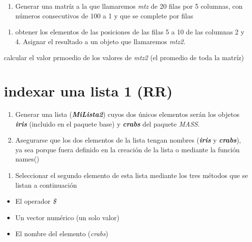 \documentclass[]{book}
\providecommand{\tightlist}{%
  \setlength{\itemsep}{0pt}\setlength{\parskip}{0pt}}
\begin{document}
\begin{enumerate}
\def\labelenumi{\arabic{enumi}.}
\tightlist
\item
  Generar una matríz a la que llamaremos \emph{mtz} de 20 filas por 5 columnas, con números consecutivos de 100 a 1 y que se complete por filas
\end{enumerate}

\begin{enumerate}
\def\labelenumi{\arabic{enumi}.}
\setcounter{enumi}{1}
\tightlist
\item
  obtener los elementos de las posiciones de las filas 5 a 10 de las columnas 2 y 4. Asignar el resultado a un objeto que llamaremos \emph{mtz2}.
\end{enumerate}

calcular el valor prmoedio de los valores de \emph{mtz2} (el promedio de toda la matríz)

\hypertarget{indexar-una-lista-1-rr}{%
\section{indexar una lista 1 (RR)}\label{indexar-una-lista-1-rr}}

\begin{enumerate}
\def\labelenumi{\arabic{enumi}.}
\item
  Generar una lista (\textbf{\emph{MiLista2}}) cuyos dos únicos elementos serán los objetos \textbf{\emph{iris}} (incluido en el paquete base) y \textbf{\emph{crabs}} del paquete \emph{MASS}.
\item
  Asegurarse que los dos elementos de la lista tengan nombres (\textbf{\emph{iris}} y \textbf{\emph{crabs}}), ya sea porque fuera definido en la creación de la lista o mediante la función names()
\end{enumerate}

\begin{enumerate}
\def\labelenumi{\arabic{enumi}.}
\setcounter{enumi}{1}
\tightlist
\item
  Seleccionar el segundo elemento de esta lista mediante los tres métodos que se listan a continuación
\end{enumerate}

\begin{itemize}
\tightlist
\item
  El operador \emph{\$}
\item
  Un vector numérico (un solo valor)
\item
  El nombre del elemento (\emph{crabs})
\end{itemize}
\end{document}

